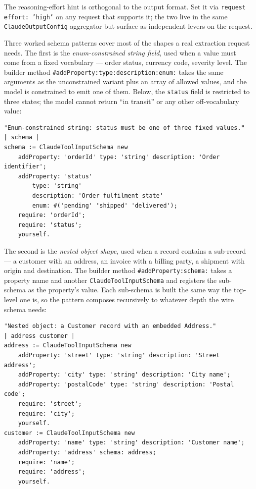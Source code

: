 \documentclass[a4paper,10pt,fleqn]{article}
\newcommand{\cls}[1]{\texttt{#1}}
\newcommand{\sel}[1]{\texttt{\##1}}
\begin{document}
The reasoning-effort hint is orthogonal to the output format.  Set
it via \texttt{request effort: 'high'} on any request that supports
it; the two live in the same \texttt{ClaudeOutputConfig} aggregator
but surface as independent levers on the request.

Three worked schema patterns cover most of the shapes a real
extraction request needs.  The first is the \emph{enum-constrained
string field}, used when a value must come from a fixed vocabulary
--- order status, currency code, severity level.  The builder
method \sel{addProperty:type:description:enum:} takes the same
arguments as the unconstrained variant plus an array of allowed
values, and the model is constrained to emit one of them.  Below,
the \texttt{status} field is restricted to three states; the model
cannot return ``in transit'' or any other off-vocabulary value:

\begin{lstlisting}[language={}]
"Enum-constrained string: status must be one of three fixed values."
| schema |
schema := ClaudeToolInputSchema new
    addProperty: 'orderId' type: 'string' description: 'Order identifier';
    addProperty: 'status'
        type: 'string'
        description: 'Order fulfilment state'
        enum: #('pending' 'shipped' 'delivered');
    require: 'orderId';
    require: 'status';
    yourself.
\end{lstlisting}

The second is the \emph{nested object shape}, used when a record
contains a sub-record --- a customer with an address, an invoice
with a billing party, a shipment with origin and destination.  The
builder method \sel{addProperty:schema:} takes a property name and
another \cls{ClaudeToolInputSchema} and registers the sub-schema as
the property's value.  Each sub-schema is built the same way the
top-level one is, so the pattern composes recursively to whatever
depth the wire schema needs:

\begin{lstlisting}[language={}]
"Nested object: a Customer record with an embedded Address."
| address customer |
address := ClaudeToolInputSchema new
    addProperty: 'street' type: 'string' description: 'Street address';
    addProperty: 'city' type: 'string' description: 'City name';
    addProperty: 'postalCode' type: 'string' description: 'Postal code';
    require: 'street';
    require: 'city';
    yourself.
customer := ClaudeToolInputSchema new
    addProperty: 'name' type: 'string' description: 'Customer name';
    addProperty: 'address' schema: address;
    require: 'name';
    require: 'address';
    yourself.
\end{lstlisting}
\end{document}
